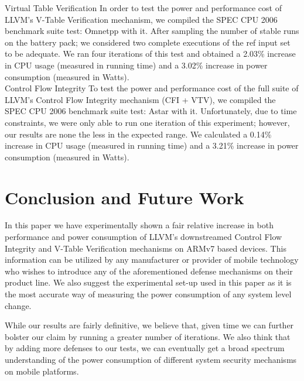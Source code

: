 \documentclass[letterpaper, 10 pt, conference]{ieeeconf}  %
\begin{document}
Virtual Table Verification
In order to test the power and performance cost of LLVM's V-Table Verification mechanism, we compiled the SPEC CPU 2006 benchmark suite test: Omnetpp with it. After sampling the number of stable runs on the battery pack; we considered two complete executions of the ref input set to be adequate. We ran four iterations of this test and obtained a 2.03\% increase in CPU usage (measured in running time) and a 3.02\% increase in power consumption (measured in Watts).\\

Control Flow Integrity
To test the power and performance cost of the full suite of LLVM's Control Flow Integrity mechanism (CFI + VTV), we compiled the SPEC CPU 2006 benchmark suite test: Astar with it. Unfortunately, due to time constraints, we were only able to run one iteration of this experiment; however, our results are none the less in the expected range. We calculated a 0.14\% increase in CPU usage (measured in running time) and a 3.21\% increase in power consumption (measured in Watts).\\


\section{Conclusion and Future Work}

In this paper we have experimentally shown a fair relative increase in both performance and power consumption of LLVM's downstreamed Control Flow Integrity and V-Table Verification mechanisms on ARMv7 based devices. This information can be utilized by any manufacturer or provider of mobile technology who wishes to introduce any of the aforementioned defense mechanisms on their product line. We also suggest the experimental set-up used in this paper as it is the most accurate way of measuring the power consumption of any system level change.

While our results are fairly definitive, we believe that, given time we can further bolster our claim by running a greater number of iterations. We also think that by adding more defenses to our tests, we can eventually get a broad spectrum understanding of the power consumption of different system security mechanisms on mobile platforms.


\addtolength{\textheight}{-12cm}   %




\nocite{*}

\end{document}
